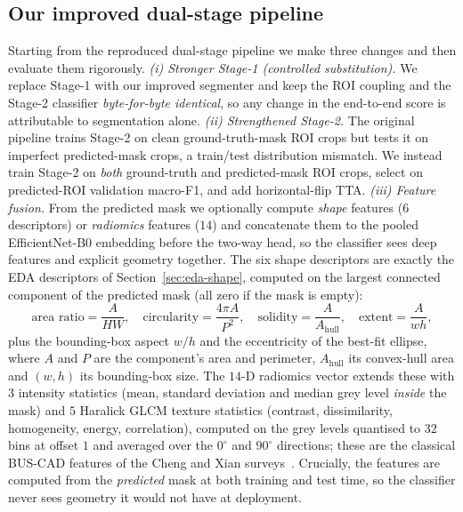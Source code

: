\documentclass[11pt]{article}
\begin{document}
\subsection{Our improved dual-stage pipeline}
\label{sec:improved-dual}
Starting from the reproduced dual-stage pipeline we make three changes and then
evaluate them rigorously.
\emph{(i) Stronger Stage-1 (controlled substitution).} We replace Stage-1 with our
improved segmenter and keep the ROI coupling and the Stage-2 classifier
\emph{byte-for-byte identical}, so any change in the end-to-end score is
attributable to segmentation alone.
\emph{(ii) Strengthened Stage-2.} The original pipeline trains Stage-2 on clean
ground-truth-mask ROI crops but tests it on imperfect predicted-mask crops, a
train/test distribution mismatch. We instead train Stage-2 on \emph{both}
ground-truth and predicted-mask ROI crops, select on predicted-ROI validation
macro-F1, and add horizontal-flip TTA.
\emph{(iii) Feature fusion.} From the predicted mask we optionally compute
\emph{shape} features ($6$ descriptors) or \emph{radiomics} features ($14$) and
concatenate them to the pooled EfficientNet-B0 embedding before the two-way head,
so the classifier sees deep features and explicit geometry together. The six shape
descriptors are exactly the EDA descriptors of Section~\ref{sec:eda-shape},
computed on the largest connected component of the predicted mask (all zero if the
mask is empty):
\begin{equation}
\text{area ratio} = \frac{A}{HW},\quad
\text{circularity} = \frac{4\pi A}{P^2},\quad
\text{solidity} = \frac{A}{A_{\mathrm{hull}}},\quad
\text{extent} = \frac{A}{wh},
\end{equation}
plus the bounding-box aspect $w/h$ and the eccentricity of the best-fit ellipse,
where $A$ and $P$ are the component's area and perimeter, $A_{\mathrm{hull}}$ its
convex-hull area and $(w,h)$ its bounding-box size. The $14$-D radiomics vector
extends these with $3$ intensity statistics (mean, standard deviation and median
grey level \emph{inside} the mask) and $5$ Haralick GLCM texture statistics
(contrast, dissimilarity, homogeneity, energy, correlation), computed on the
grey levels quantised to $32$ bins at offset $1$ and averaged over the
$0^{\circ}$ and $90^{\circ}$ directions; these are the classical BUS-CAD features
of the Cheng and Xian surveys~\cite{cheng2010survey,xian2018survey}. Crucially, the
features are computed from the \emph{predicted} mask at both training and test
time, so the classifier never sees geometry it would not have at deployment.
\end{document}
